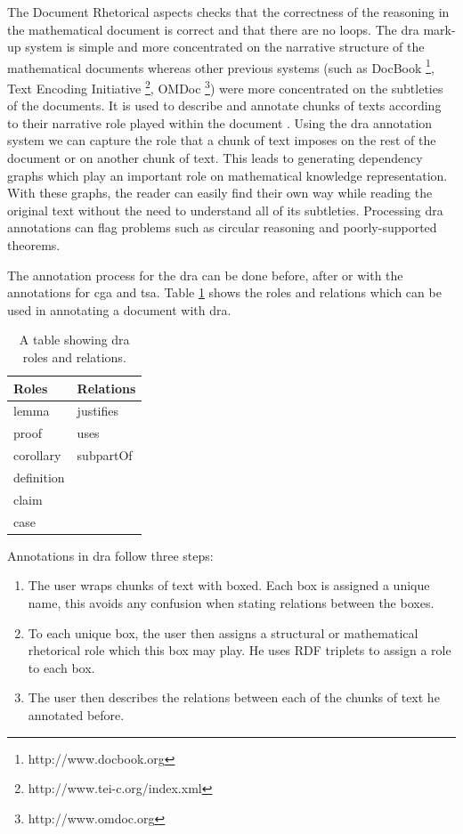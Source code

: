 The Document Rhetorical aspects checks that the correctness of the reasoning in
the mathematical document is correct and that there are no loops. The \gls{dra}
mark-up system is simple and more concentrated on the narrative structure of the
mathematical documents whereas other previous systems (such as DocBook
\footnote{http://www.docbook.org}, Text Encoding Initiative
\footnote{http://www.tei-c.org/index.xml}, OMDoc
\footnote{http://www.omdoc.org}) were more concentrated on  the subtleties of
the documents. It is used to describe and annotate chunks of texts according to
their narrative role played within the document \cite{krzysztofphd}. Using the
\gls{dra} annotation system we can capture the role that a chunk of text imposes
on the rest of the document or on another chunk of text. This leads to
generating dependency graphs which play an important role on mathematical
knowledge representation. With these graphs, the reader can easily find their
own way while reading the original text without the need to understand all of
its subtleties. Processing \gls{dra} annotations can flag problems such as
circular reasoning and poorly-supported theorems.

The annotation process for the \gls{dra} can be done before, after or with the
annotations for \gls{cga} and \gls{tsa}. Table \ref{tab:drarolesandrelations}
shows the roles and relations which can be used in annotating a document with
\gls{dra}.

\begin{table}[H]
\centering
\begin{tabular}{|l||l|}
\hline
\textbf{Roles} & \textbf{Relations} \\
\hline
lemma & justifies \\
proof & uses \\
corollary & subpartOf \\
definition &  \\
claim & \\
case & \\
\hline
\end{tabular}
\caption{A table showing \gls{dra} roles and relations. \label{tab:drarolesandrelations}}
\end{table}

Annotations in \gls{dra} follow three steps:

\begin{enumerate}
\item The user wraps chunks of text with boxed. Each box is assigned a unique
name, this avoids any confusion when stating relations between the boxes.

\item To each unique box, the user then assigns a structural or mathematical
rhetorical role which this box may play. He uses RDF triplets to assign a role
to each box.

\item The user then describes the relations between each of the chunks of text
he annotated before.
\end{enumerate}

